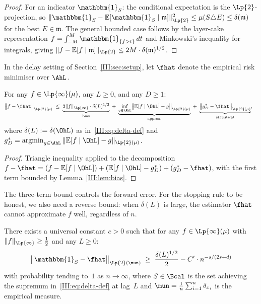 \begin{proof}
For an indicator $\mathbbm{1}_S$: the conditional expectation is the $\Lp{2}$-projection, so
$\|\mathbbm{1}_S - \mathbb{E}[\mathbbm{1}_S \mid \mathfrak{m}]\|_{\Lp{2}}^2 \leq \mu(S \triangle E)
\leq \delta(\mathfrak{m})$ for the best $E \in \mathfrak{m}$.
The general bounded case follows by the layer-cake representation
$f = \int_{-M}^{M} \mathbbm{1}_{\{f > t\}}\,dt$ and Minkowski's inequality for integrals,
giving $\|f - \mathbb{E}[f \mid \mathfrak{m}]\|_{\Lp{2}} \leq 2M \cdot \delta(\mathfrak{m})^{1/2}$.
\end{proof}

In the delay setting of Section~\ref{III:sec:setup}, let $\fhat$ denote the empirical risk minimiser over $\AhL$.

\begin{lemma}
\label{III:lem:three-term}
For any $f \in \Lp{\infty}(\mu)$, any $L \geq 0$, and any $D \geq 1$:
\begin{align}
  \bigl\|f - \fhat\bigr\|_{\Lp{2}(\mu)}
  &\;\leq\;
    \underbrace{2\|f\|_{\Lp{\infty}} \cdot \delta(L)^{1/2}}_{\text{bias}}
  \;+\;
    \underbrace{\inf_{g \in \AhL}\bigl\|
      \mathbb{E}[f \mid \OhL] - g
    \bigr\|_{\Lp{2}(\mu)}}_{\text{approx.}}
  \;+\;
    \underbrace{\bigl\|g_D^* - \fhat\bigr\|_{\Lp{2}(\mu)}}_{\text{statistical}},
  \label{III:eq:three-term}
\end{align}
where $\delta(L) := \delta(\OhL)$ as in~\eqref{III:eq:delta-def} and
$g_D^* = \operatorname{argmin}_{g \in \AhL} \|\mathbb{E}[f \mid \OhL] - g\|_{\Lp{2}(\mu)}$.
\end{lemma}

\begin{proof}
Triangle inequality applied to the decomposition
$f - \fhat = (f - \mathbb{E}[f \mid \OhL]) + (\mathbb{E}[f \mid \OhL] - g_D^*)
+ (g_D^* - \fhat)$, with the first term bounded by Lemma~\ref{III:lem:bias}.
\end{proof}

The three-term bound controls the forward error.
For the stopping rule to be honest, we also need a reverse bound: when
$\delta(L)$ is large, the estimator $\fhat$ cannot approximate $f$ well,
regardless of $n$.

\begin{lemma}
\label{III:lem:reverse}
There exists a universal constant $c > 0$ such that for any $f \in \Lp{\infty}(\mu)$
with $\|f\|_{\Lp{\infty}} \geq \frac{1}{2}$ and any $L \geq 0$:
\[
  \bigl\|\mathbbm{1}_S - \fhat\bigr\|_{\Lp{2}(\mun)}
  \;\geq\;
  \frac{\delta(L)^{1/2}}{2} - C' \cdot n^{-s/(2s+d)}
\]
with probability tending to~$1$ as $n \to \infty$, where $S \in \Bcal$ is
the set achieving the supremum in~\eqref{III:eq:delta-def} at lag~$L$ and
$\mun = \frac{1}{n}\sum_{i=1}^n \delta_{x_i}$ is the empirical measure.
\end{lemma}

